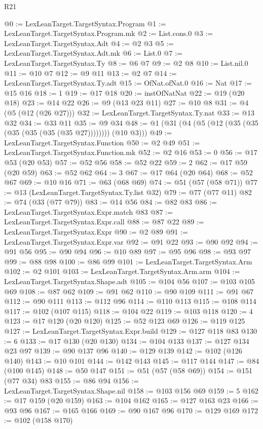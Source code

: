 \begin{lexlean}{R21}
\begin{coremodule}
@0 := LexLeanTarget.TargetSyntax.Program
@1 := LexLeanTarget.TargetSyntax.Program.mk
@2 := List.cons.{0}
@3 := LexLeanTarget.TargetSyntax.Adt
@4 := @2 @3
@5 := LexLeanTarget.TargetSyntax.Adt.mk
@6 := List.{0}
@7 := LexLeanTarget.TargetSyntax.Ty
@8 := @6 @7
@9 := @2 @8
@10 := List.nil.{0}
@11 := @10 @7
@12 := @9 @11
@13 := @2 @7
@14 := LexLeanTarget.TargetSyntax.Ty.adt
@15 := OfNat.ofNat.{0}
@16 := Nat
@17 := @15 @16
@18 := 1
@19 := @17 @18
@20 := instOfNatNat
@22 := @19 (@20 @18)
@23 := @14 @22
@26 := @9 (@13 @23 @11)
@27 := @10 @8
@31 := @4 (@5 (@12 (@26 @27)))
@32 := LexLeanTarget.TargetSyntax.Ty.nat
@33 := @13 @32
@34 := @33 @11
@35 := @9 @34
@48 := @1 (@31 (@4 (@5 (@12 (@35 (@35 (@35 (@35 (@35 (@35 @27)))))))) (@10 @3)))
@49 := LexLeanTarget.TargetSyntax.Function
@50 := @2 @49
@51 := LexLeanTarget.TargetSyntax.Function.mk
@52 := @2 @16
@53 := 0
@56 := @17 @53 (@20 @53)
@57 := @52 @56
@58 := @52 @22
@59 := 2
@62 := @17 @59 (@20 @59)
@63 := @52 @62
@64 := 3
@67 := @17 @64 (@20 @64)
@68 := @52 @67
@69 := @10 @16
@71 := @63 (@68 @69)
@74 := @51 (@57 (@58 @71))
@77 := @13 (LexLeanTarget.TargetSyntax.Ty.list @32)
@79 := @77 (@77 @11)
@82 := @74 (@33 (@77 @79))
@83 := @14 @56
@84 := @82 @83
@86 := LexLeanTarget.TargetSyntax.Expr.match @83
@87 := LexLeanTarget.TargetSyntax.Expr.call
@88 := @87 @22
@89 := LexLeanTarget.TargetSyntax.Expr
@90 := @2 @89
@91 := LexLeanTarget.TargetSyntax.Expr.var
@92 := @91 @22
@93 := @90 @92
@94 := @91 @56
@95 := @90 @94
@96 := @10 @89
@97 := @95 @96
@98 := @93 @97
@99 := @88 @98
@100 := @86 @99
@101 := LexLeanTarget.TargetSyntax.Arm
@102 := @2 @101
@103 := LexLeanTarget.TargetSyntax.Arm.arm
@104 := LexLeanTarget.TargetSyntax.Shape.adt
@105 := @104 @56
@107 := @103 @105 @69
@108 := @87 @62
@109 := @91 @62
@110 := @90 @109
@111 := @91 @67
@112 := @90 @111
@113 := @112 @96
@114 := @110 @113
@115 := @108 @114
@117 := @102 (@107 @115)
@118 := @104 @22
@119 := @103 @118
@120 := 4
@123 := @17 @120 (@20 @120)
@125 := @52 @123 @69
@126 := @119 @125
@127 := LexLeanTarget.TargetSyntax.Expr.build
@129 := @127 @118 @83
@130 := 6
@133 := @17 @130 (@20 @130)
@134 := @104 @133
@137 := @127 @134 @23 @97
@139 := @90 @137 @96
@140 := @129 @139
@142 := @102 (@126 @140)
@143 := @10 @101
@144 := @142 @143
@145 := @117 @144
@147 := @84 (@100 @145)
@148 := @50 @147
@151 := @51 (@57 (@58 @69))
@154 := @151 (@77 @34) @83
@155 := @86 @94
@156 := LexLeanTarget.TargetSyntax.Shape.nil
@158 := @103 @156 @69
@159 := 5
@162 := @17 @159 (@20 @159)
@163 := @104 @162
@165 := @127 @163 @23
@166 := @93 @96
@167 := @165 @166
@169 := @90 @167 @96
@170 := @129 @169
@172 := @102 (@158 @170)

\end{coremodule}
\end{lexlean}
